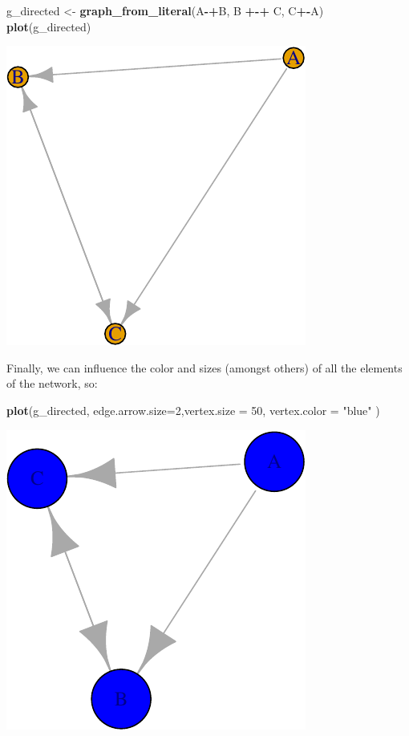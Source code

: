 \documentclass[]{article}
\newenvironment{Shaded}{\begin{snugshade}}{\end{snugshade}}
\newcommand{\KeywordTok}[1]{\textcolor[rgb]{0.13,0.29,0.53}{\textbf{#1}}}
\newcommand{\DataTypeTok}[1]{\textcolor[rgb]{0.13,0.29,0.53}{#1}}
\newcommand{\DecValTok}[1]{\textcolor[rgb]{0.00,0.00,0.81}{#1}}
\newcommand{\StringTok}[1]{\textcolor[rgb]{0.31,0.60,0.02}{#1}}
\newcommand{\OperatorTok}[1]{\textcolor[rgb]{0.81,0.36,0.00}{\textbf{#1}}}
\newcommand{\NormalTok}[1]{#1}
\theoremstyle{definition}
\theoremstyle{definition}
\theoremstyle{definition}
\theoremstyle{remark}
\begin{document}
\begin{Shaded}
\begin{Highlighting}[]
\NormalTok{g_directed <-}\StringTok{ }\KeywordTok{graph_from_literal}\NormalTok{(A}\OperatorTok{-+}\NormalTok{B, B }\OperatorTok{+-+}\StringTok{ }\NormalTok{C, C}\OperatorTok{+-}\NormalTok{A)}
\KeywordTok{plot}\NormalTok{(g_directed)}
\end{Highlighting}
\end{Shaded}

\includegraphics{ResearchTools_files/figure-latex/unnamed-chunk-47-1.pdf}

Finally, we can influence the color and sizes (amongst others) of all
the elements of the network, so:

\begin{Shaded}
\begin{Highlighting}[]
\KeywordTok{plot}\NormalTok{(g_directed, }\DataTypeTok{edge.arrow.size=}\DecValTok{2}\NormalTok{,}\DataTypeTok{vertex.size =} \DecValTok{50}\NormalTok{, }\DataTypeTok{vertex.color =} \StringTok{"blue"}\NormalTok{ )}
\end{Highlighting}
\end{Shaded}

\includegraphics{ResearchTools_files/figure-latex/unnamed-chunk-48-1.pdf}
\end{document}
